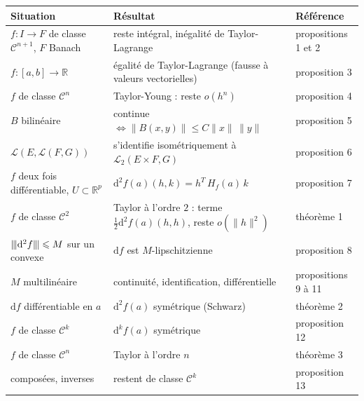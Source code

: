 \documentclass[a4paper,twoside]{report}
\newcommand{\R}{\mathbb{R}}
\newcommand{\dd}{\mathrm{d}}                      %
\newcommand{\tra}[1]{{#1}^{T}}                    %
\newcommand{\norme}[1]{\lVert #1 \rVert}         %
\newcommand{\nop}[1]{|\mkern-1.5mu|\mkern-1.5mu|#1|\mkern-1.5mu|\mkern-1.5mu|}   %
\newcommand{\Cc}{\mathcal{C}}                     %
\newcommand{\Lc}{\mathcal{L}}                     %
\newcommand{\Hs}{H}                               %
\begin{document}
\begin{center}
\renewcommand{\arraystretch}{1.35}
\begin{tabularx}{15cm}{|>{\raggedright\arraybackslash}p{4.4cm}|>{\raggedright\arraybackslash}X|>{\centering\arraybackslash}p{2.4cm}|}
\hline
\rowcolor{couleurD!35} \textbf{Situation} & \textbf{Résultat} & \textbf{Référence} \\ \hline
$f : I \to F$ de classe $\Cc^{n + 1}$, $F$ Banach & reste intégral, inégalité de Taylor-Lagrange & propositions 1 et 2 \\ \hline
$f : [a, b] \to \R$ & égalité de Taylor-Lagrange (fausse à valeurs vectorielles) & proposition 3 \\ \hline
$f$ de classe $\Cc^{n}$ & Taylor-Young : reste $o(h^{n})$ & proposition 4 \\ \hline
$B$ bilinéaire & continue $\iff \norme{B(x, y)} \leqslant C\norme{x}\,\norme{y}$ & proposition 5 \\ \hline
$\Lc(E, \Lc(F, G))$ & s'identifie isométriquement à $\Lc_{2}(E \times F, G)$ & proposition 6 \\ \hline
$f$ deux fois différentiable, $U \subset \R^{p}$ & $\dd^{2} f(a)(h, k) = \tra{h}\,\Hs_{f}(a)\,k$ & proposition 7 \\ \hline
$f$ de classe $\Cc^{2}$ & Taylor à l'ordre $2$ : terme $\frac{1}{2}\dd^{2} f(a)(h, h)$, reste $o(\norme{h}^{2})$ & théorème 1 \\ \hline
$\nop{\dd^{2} f} \leqslant M$ sur un convexe & $\dd f$ est $M$-lipschitzienne & proposition 8 \\ \hline
$M$ multilinéaire & continuité, identification, différentielle & propositions 9 à 11 \\ \hline
$\dd f$ différentiable en $a$ & $\dd^{2} f(a)$ symétrique (Schwarz) & théorème 2 \\ \hline
$f$ de classe $\Cc^{k}$ & $\dd^{k} f(a)$ symétrique & proposition 12 \\ \hline
$f$ de classe $\Cc^{n}$ & Taylor à l'ordre $n$ & théorème 3 \\ \hline
composées, inverses & restent de classe $\Cc^{k}$ & proposition 13 \\ \hline
\end{tabularx}
\end{center}
\end{document}
